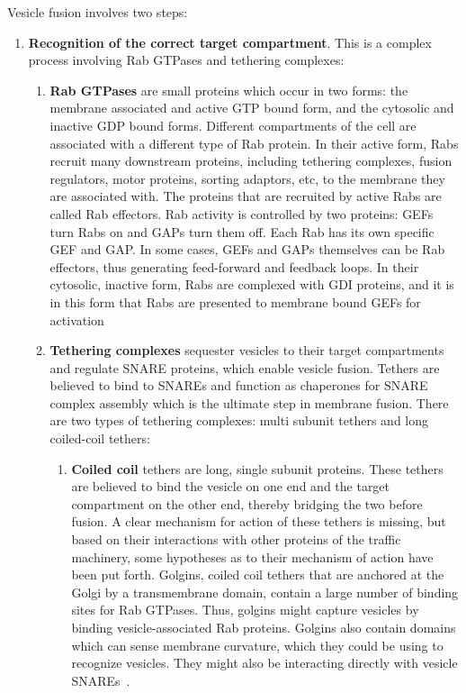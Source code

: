 Vesicle fusion involves two steps:
\begin{enumerate}
	\item \textbf{Recognition of the correct target compartment}. 
	This is a complex process involving Rab
	GTPases and tethering complexes:
	
	\begin{enumerate}[label=(\roman*)]
		\item \textbf{Rab GTPases}  are small proteins which occur in two forms: the membrane associated and active
		GTP bound form, and the cytosolic and inactive GDP bound forms. 
		Different compartments of the
		cell are associated with a different type of Rab protein. In their active form, Rabs recruit many
		downstream proteins, including tethering complexes, fusion regulators, motor proteins, sorting
		adaptors, etc, to the membrane they are associated with. 
		The proteins that are recruited by active
		Rabs are called Rab effectors.
		Rab activity is controlled by two proteins: GEFs turn Rabs on and
		GAPs turn them off. 
		Each Rab has its own specific GEF and GAP. In some cases, GEFs and GAPs
		themselves can be Rab effectors, thus generating feed-forward and feedback loops. 
		In their cytosolic, inactive form, Rabs are complexed with GDI proteins, and it is in this form that Rabs are presented to membrane bound GEFs for activation~\cite{muller2018molecular}
		
		\item \textbf{Tethering complexes} sequester vesicles to their target compartments and regulate SNARE
		proteins, which enable vesicle fusion. 
		Tethers are believed to bind to SNAREs and function as
		chaperones for SNARE complex assembly which is the ultimate step in membrane fusion. 
		There are two types of tethering complexes: multi subunit tethers and long coiled-coil tethers:
		
		\begin{enumerate}[label=(\alph*)]
			\item \textbf{Coiled coil} tethers are long, single subunit proteins. 
			These tethers are believed to bind the
			vesicle on one end and the target compartment on the other end, thereby bridging the two before
			fusion.
			A clear mechanism for action of these tethers is missing, but based on their interactions with
			other proteins of the traffic machinery, some hypotheses as to their mechanism of action have been
			put forth. 
			Golgins, coiled coil tethers that are anchored at the Golgi by a transmembrane domain, contain a large number of binding sites for Rab GTPases. 
			Thus, golgins might capture vesicles by
			binding vesicle-associated Rab proteins. 
			Golgins also contain domains which can sense membrane
			curvature, which they could be using to recognize vesicles. 
			They might also be interacting directly
			with vesicle SNAREs~\cite{baker2016chaperoning}.
			

\end{enumerate}
\end{enumerate}
\end{enumerate}
